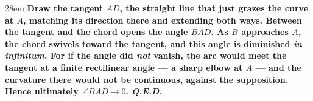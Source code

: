 \documentclass[border=4pt]{standalone}
\begin{document}
\begin{varwidth}{28em}
\large\bfseries
Draw \textcolor{tanorange}{the tangent $AD$}, the straight line that just grazes \textcolor{arcblue}{the curve} at $A$, matching its direction there and extending both ways. Between \textcolor{tanorange}{the tangent} and \textcolor{chordgreen}{the chord} opens \textcolor{anglered}{the angle $BAD$}. As $B$ approaches $A$, \textcolor{chordgreen}{the chord} swivels toward \textcolor{tanorange}{the tangent}, and \textcolor{anglered}{this angle} is diminished \emph{in infinitum}. For if \textcolor{anglered}{the angle} did \emph{not} vanish, \textcolor{arcblue}{the arc} would meet \textcolor{tanorange}{the tangent} at a finite rectilinear angle — a sharp elbow at $A$ — and the curvature there would not be continuous, against the supposition. Hence ultimately $\angle BAD \to 0$. \textit{Q.E.D.}
\end{varwidth}
\end{document}
